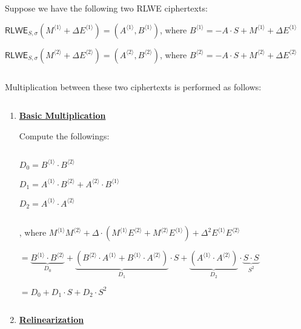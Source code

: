 \begin{tcolorbox}[title={\textbf{\tboxlabel{\ref*{subsec:bgv-mult-cipher}} BGV Ciphertext-to-Ciphertext Multiplication}}]

Suppose we have the following two RLWE ciphertexts:

$\textsf{RLWE}_{S, \sigma}(M^{\langle 1 \rangle} + \Delta E^{\langle 1 \rangle}) = (A^{\langle 1 \rangle}, B^{\langle 1 \rangle})$, \text{ } where $B^{\langle 1 \rangle} = -A \cdot S +  M^{\langle 1 \rangle} + \Delta E^{\langle 1 \rangle}$

$\textsf{RLWE}_{S, \sigma}(M^{\langle 2 \rangle} + \Delta E^{\langle 2 \rangle}) = (A^{\langle 2 \rangle}, B^{\langle 2 \rangle})$, \text{ } where $B^{\langle 2 \rangle} = -A \cdot S +  M^{\langle 2 \rangle} + \Delta E^{\langle 2 \rangle}$

$ $

Multiplication between these two ciphertexts is performed as follows:

$ $

\begin{enumerate}
\item \textbf{\underline{Basic Multiplication}}

Compute the followings:

$ $

$D_0 = B^{\langle 1 \rangle}\cdot B^{\langle 2 \rangle}$

$D_1 = A^{\langle 1 \rangle}\cdot B^{\langle 2 \rangle} + A^{\langle 2 \rangle}\cdot B^{\langle 1 \rangle}$

$D_2 = A^{\langle 1 \rangle} \cdot A^{\langle 2 \rangle}$

$ $

, where $M^{\langle 1 \rangle}M^{\langle 2 \rangle} + \Delta\cdot (M^{\langle 1 \rangle}E^{\langle 2 \rangle} + M^{\langle 2 \rangle}E^{\langle 1 \rangle}) + \Delta^2E^{\langle 1 \rangle}E^{\langle 2 \rangle}$

$ = \underbrace{B^{\langle 1 \rangle}\cdot B^{\langle 2 \rangle}}_{D_0}  + \underbrace{(B^{\langle 2 \rangle}\cdot A^{\langle 1 \rangle} + B^{\langle 1 \rangle}\cdot A^{\langle 2 \rangle})}_{D_1} \cdot S + \underbrace{(A^{\langle 1 \rangle} \cdot A^{\langle 2 \rangle})}_{D_2} \cdot \underbrace{S \cdot S}_{S^2}$

$= D_0 + D_1\cdot S + D_2 \cdot S^2$

$ $

\item \textbf{\underline{Relinearization}} 


\end{enumerate}
\end{tcolorbox}
